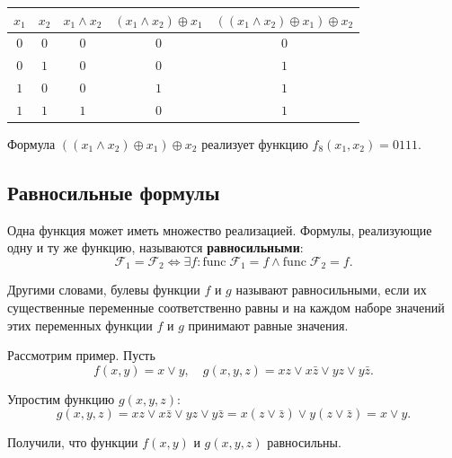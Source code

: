 \documentclass[a5paper, 11pt]{extarticle}
\theoremstyle{definition}
\theoremstyle{definition}
\theoremstyle{definition}
\numberwithin{figure}{section}
\numberwithin{table}{section}
\begin{document}
\begin{table}[H]
    \renewcommand*{\arraystretch}{1.5}
    \begin{longtable}{|c|c|c|c|c|}
        \hline
        \(x_1\) & \(x_2\) & \(x_1 \land x_2\) & \((x_1 \land x_2) \oplus x_1\) & \(((x_1 \land x_2) \oplus x_1) \oplus x_2\) \\
        \hline
        \(0\)   & \(0\)   & \(0\)             & \(0\)                          & \(0\)                                       \\
        \hline
        \(0\)   & \(1\)   & \(0\)             & \(0\)                          & \(1\)                                       \\
        \hline
        \(1\)   & \(0\)   & \(0\)             & \(1\)                          & \(1\)                                       \\
        \hline
        \(1\)   & \(1\)   & \(1\)             & \(0\)                          & \(1\)                                       \\
        \hline
    \end{longtable}
\end{table}

Формула \(((x_1 \land x_2) \oplus x_1) \oplus x_2\) реализует функцию \(f_8(x_1, x_2) = 0111\).

\subsection{Равносильные формулы}

Одна функция может иметь множество реализацией. Формулы, реализующие одну и ту же функцию, называются \textbf{равносильными}:
\[
    \mathcal{F}_1 = \mathcal{F}_2
    \iff
    \exists f: \text{func} \; \mathcal{F}_1 = f \land \text{func} \; \mathcal{F}_2 = f.
\]

Другими словами, булевы функции \(f\) и \(g\) называют равносильными, если их существенные переменные соответственно равны и на каждом наборе значений этих переменных функции \(f\) и \(g\) принимают равные значения.

Рассмотрим пример. Пусть
\[
    f(x, y) = x \lor y,
    \quad
    g(x, y, z) = xz \lor x \bar{z} \lor yz \lor y \bar{z}.
\]

Упростим функцию \(g(x, y, z)\):
\[
    g(x, y, z) =
    xz \lor x \bar{z} \lor yz \lor y \bar{z} =
    x(z \lor \bar{z}) \lor y(z \lor \bar{z}) =
    x \lor y.
\]

Получили, что функции \(f(x, y)\) и \(g(x, y, z)\) равносильны.
\end{document}
